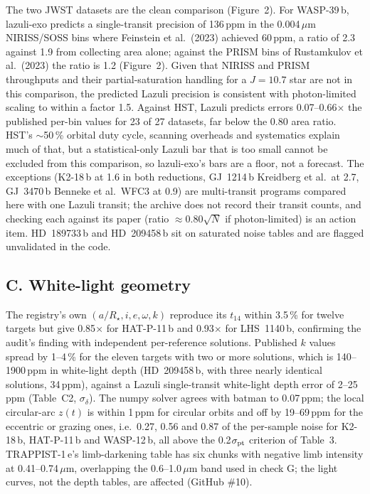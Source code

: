 \documentclass[11pt]{article}
\begin{document}
The two JWST datasets are the clean comparison (Figure~2). For WASP-39\,b, lazuli-exo predicts a single-transit precision of 136\,ppm in the 0.004\,$\mu$m NIRISS/SOSS bins where Feinstein et al.\ (2023) achieved 60\,ppm, a ratio of 2.3 against 1.9 from collecting area alone; against the PRISM bins of Rustamkulov et al.\ (2023) the ratio is 1.2 (Figure~2). Given that NIRISS and PRISM throughputs and their partial-saturation handling for a $J=10.7$ star are not in this comparison, the predicted Lazuli precision is consistent with photon-limited scaling to within a factor 1.5. Against HST, Lazuli predicts errors 0.07--0.66$\times$ the published per-bin values for 23 of 27 datasets, far below the 0.80 area ratio. HST's $\sim$50\,\% orbital duty cycle, scanning overheads and systematics explain much of that, but a statistical-only Lazuli bar that is too small cannot be excluded from this comparison, so lazuli-exo's bars are a floor, not a forecast. The exceptions (K2-18\,b at 1.6 in both reductions, GJ~1214\,b Kreidberg et al.\ at 2.7, GJ~3470\,b Benneke et al.\ WFC3 at 0.9) are multi-transit programs compared here with one Lazuli transit; the archive does not record their transit counts, and checking each against its paper (ratio $\approx 0.80\sqrt{N}$ if photon-limited) is an action item. HD~189733\,b and HD~209458\,b sit on saturated noise tables and are flagged unvalidated in the code.

\subsection*{C. White-light geometry}



The registry's own $(a/R_\star, i, e, \omega, k)$ reproduce its $t_{14}$ within 3.5\,\% for twelve targets but give 0.85$\times$ for HAT-P-11\,b and 0.93$\times$ for LHS~1140\,b, confirming the audit's finding with independent per-reference solutions. Published $k$ values spread by 1--4\,\% for the eleven targets with two or more solutions, which is 140--1900\,ppm in white-light depth (HD~209458\,b, with three nearly identical solutions, 34\,ppm), against a Lazuli single-transit white-light depth error of 2--25\,ppm (Table~C2, $\sigma_\delta$). The numpy solver agrees with batman to 0.07\,ppm; the local circular-arc $z(t)$ is within 1\,ppm for circular orbits and off by 19--69\,ppm for the eccentric or grazing ones, i.e.\ 0.27, 0.56 and 0.87 of the per-sample noise for K2-18\,b, HAT-P-11\,b and WASP-12\,b, all above the 0.2$\sigma_{\rm pt}$ criterion of Table~3. TRAPPIST-1\,e's limb-darkening table has six chunks with negative limb intensity at 0.41--0.74\,$\mu$m, overlapping the 0.6--1.0\,$\mu$m band used in check G; the light curves, not the depth tables, are affected (GitHub \#10).
\end{document}
